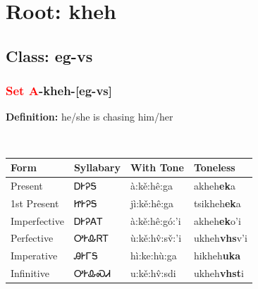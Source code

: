 \needspace{4in}
\section*{Root: kheh}
\nopagebreak
{}
\needspace{3in}
\subsection*{Class: eg-vs}
\nopagebreak
\needspace{2in}
\subsubsection*{\textcolor{Red}{Set A}{-}\textbf{kheh}{-}[eg-vs]}
\nopagebreak
\textbf{Definition: } he/she is chasing him/her
\\[0.5em]
\begin{tabularx}{\textwidth}{l X X X}%
\toprule%
\textbf{Form}&\textbf{Syllabary}&\textbf{With Tone}&\textbf{Toneless}\\%
\midrule%
Present&ᎠᎨᎮᎦ&à:kě:hê:ga&akheh\textbf{ek}a\\%
1st Present&ᏥᎨᎮᎦ&jì:kě:hê:ga&tsikheh\textbf{ek}a\\%
Imperfective&ᎠᎨᎮᎪᎢ&à:kě:hê:gó:’i&akheh\textbf{ek}o'i\\%
Perfective&ᎤᎨᎲᏒᎢ&ù:kě:hv̂:sv̌:’i&ukheh\textbf{vhs}v'i\\%
Imperative&ᎯᎨᎱᎦ&hì:ke:hù:ga&hikheh\textbf{uka}\\%
Infinitive&ᎤᎨᎲᏍᏗ&u:kě:hv̂:sdi&ukheh\textbf{vhst}i\\%
\bottomrule%
\end{tabularx}
\\[1em]